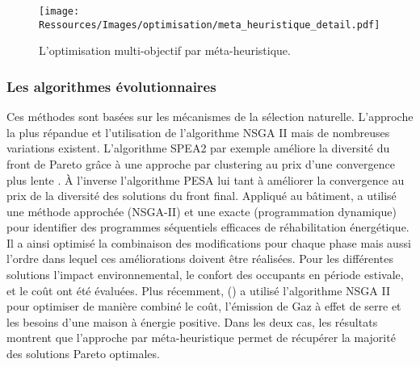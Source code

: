 \begin{figure}
    \begin{center}
        \texttt{[image: Ressources/Images/optimisation/meta\_heuristique\_detail.pdf]}
    \end{center}
    \caption{L’optimisation multi-objectif par méta-heuristique.
             \label{fig:multi_meta_detail}}
\end{figure}

\subsubsection{Les algorithmes évolutionnaires} %
\label{ssub:les_algorithmes_evolutionnaires}
Ces méthodes sont basées sur les mécanismes de la sélection naturelle. L’approche la plus
répandue et l’utilisation de l’algorithme NSGA II \parencite{Deb2002182} mais de nombreuses
variations existent. L’algorithme SPEA2 par exemple améliore la diversité du front de Pareto
grâce à une approche par clustering au prix d’une convergence plus lente \parencite{Zitzler2001}.
À l’inverse l’algorithme PESA lui tant à améliorer la convergence au prix de la diversité des
solutions du front final. Appliqué au bâtiment, \cite{Rivallain2013}
a utilisé une méthode approchée (NSGA-II) et une exacte (programmation dynamique)
pour identifier des programmes séquentiels efficaces de réhabilitation énergétique.
Il a ainsi optimisé la combinaison des modifications pour chaque phase mais aussi l’ordre
dans lequel ces améliorations doivent être réalisées.
Pour les différentes solutions l’impact environnemental, le confort des occupants en
période estivale, et le coût ont été évaluées.
Plus récemment, () a utilisé l’algorithme NSGA II pour
optimiser de manière combiné le coût, l’émission de Gaz à effet de serre et
les besoins d’une maison à énergie positive.
Dans les deux cas, les résultats montrent que l’approche par méta-heuristique permet
de récupérer la majorité des solutions Pareto optimales.


